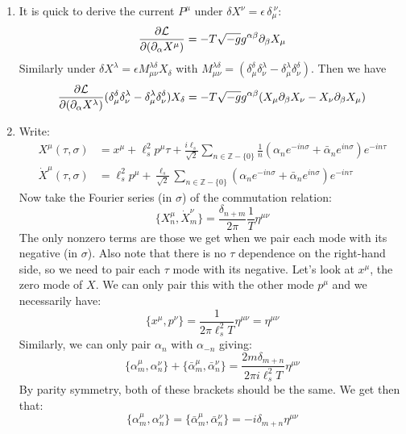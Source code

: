 \documentclass[11pt, class=article, crop=false]{standalone}
\begin{document}
\begin{enumerate}
		\item It is quick to derive the current $P^\mu$ under $\delta X^{\nu} = \epsilon\, \delta_\mu^{\ \nu}$:
		\begin{equation}
			\frac{\partial \mathcal L}{\partial (\partial_\alpha X^\mu)} = -T \sqrt{-g} g^{\alpha \beta} \partial_\beta X_\mu
		\end{equation}
		Similarly under $\delta X^{\lambda} = \epsilon M_{\mu \nu}^{\lambda \delta} X_\delta$ with $M_{\mu \nu}^{\lambda \delta} = (\delta_\mu^{\delta} \delta_\nu^\lambda - \delta_\mu^\lambda \delta_\nu^{\delta})$. Then we have 
		\begin{equation}
			\frac{\partial \mathcal L}{\partial (\partial_\alpha X^\lambda)} (\delta_\mu^{\delta} \delta_\nu^\lambda - \delta_\mu^\lambda \delta_\nu^{\delta}) X_\delta = -T \sqrt{-g} g^{\alpha \beta} (X_\mu \partial_\beta X_\nu - X_\nu \partial_\beta X_\mu)
		\end{equation}
		\item Write:
		\begin{equation}
			\begin{aligned}
				X^\mu(\tau, \sigma) &= x^\mu + \ell_s^2 p^\mu \tau + \frac{i \ell_s}{\sqrt 2} \sum_{n \in \mathbb Z - \{0\}} \frac{1}{n} (\alpha_n e^{-in\sigma} + \bar \alpha_{n} e^{i n \sigma}) e^{- i n \tau}\\
				\dot X^\mu(\tau, \sigma) &= \ell_s^2 p^\mu + \frac{\ell_s}{\sqrt 2} \sum_{n \in \mathbb Z - \{0\}} (\alpha_n e^{-in\sigma} + \bar \alpha_{n} e^{i n \sigma}) e^{- i n \tau}
			\end{aligned}
		\end{equation}
		Now take the Fourier series (in $\sigma$) of the commutation relation: 
		\begin{equation}
			\{X^\mu_{n}, \dot X^\nu_m\} = \frac{\delta_{n+m}}{2\pi} \frac{1}{T} \eta^{\mu \nu}
		\end{equation}
		The only nonzero terms are those we get when we pair each mode with its negative (in $\sigma$). Also note that there is no $\tau$ dependence on the right-hand side, so we need to pair each $\tau$ mode with its negative. Let's look at $x^\mu$, the zero mode of $X$. We can only pair this with the other mode $p^\mu$ and we necessarily have:
		\begin{equation}
			\{x^\mu, p^\nu\} = \frac{1}{2 \pi \ell_s^2 T}  \eta^{\mu \nu} = \eta^{\mu \nu}
		\end{equation}
		Similarly, we can only pair $\alpha_n$ with $\alpha_{-n}$ giving:
		\begin{equation}
			\{\alpha_m^\mu, \alpha_n^\nu\} + \{\bar \alpha_{m}^\mu, \bar \alpha_n^\nu\} = \frac{2 m \delta_{m+n}}{2 \pi i \ell_s^2 T} \eta^{\mu \nu}
		\end{equation}
		By parity symmetry, both of these brackets should be the same. We get then that:
		\begin{equation}
			\{\alpha_m^\mu, \alpha_n^\nu\}= \{\bar \alpha_{m}^\mu, \bar \alpha_n^\nu\}= -i \delta_{m+n} \eta^{\mu \nu}
		\end{equation}
		

\end{enumerate}
\end{document}
